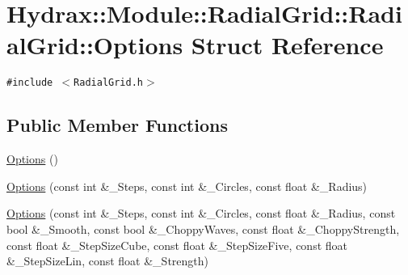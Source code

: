 \hypertarget{struct_hydrax_1_1_module_1_1_radial_grid_1_1_options}{
\section{Hydrax::Module::RadialGrid::RadialGrid::Options Struct Reference}
\label{struct_hydrax_1_1_module_1_1_radial_grid_1_1_options}
}
{\tt \#include $<$RadialGrid.h$>$}

\subsection*{Public Member Functions}
\begin{CompactItemize}
\item 
\hyperlink{struct_hydrax_1_1_module_1_1_radial_grid_1_1_options_124d0f633f807b2cd7e8f4409a76fbc4}{Options} ()
\item 
\hyperlink{struct_hydrax_1_1_module_1_1_radial_grid_1_1_options_574fc5fbf5d20a1fbc5af03fea97bbca}{Options} (const int \&\_\-Steps, const int \&\_\-Circles, const float \&\_\-Radius)
\item 
\hyperlink{struct_hydrax_1_1_module_1_1_radial_grid_1_1_options_e270a3ae95902e237814a32a64a916c5}{Options} (const int \&\_\-Steps, const int \&\_\-Circles, const float \&\_\-Radius, const bool \&\_\-Smooth, const bool \&\_\-ChoppyWaves, const float \&\_\-ChoppyStrength, const float \&\_\-StepSizeCube, const float \&\_\-StepSizeFive, const float \&\_\-StepSizeLin, const float \&\_\-Strength)
\end{CompactItemize}
